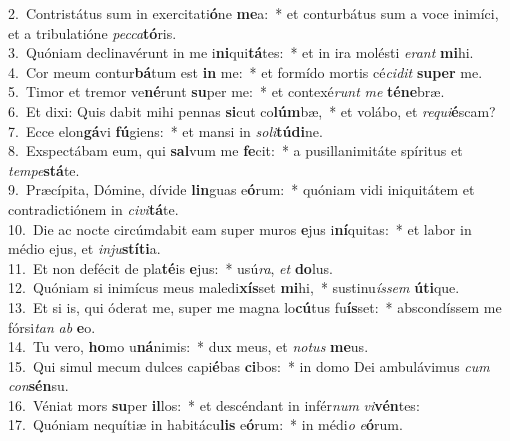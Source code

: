 {2.~}Contristátus sum in exercitati\textbf{ó}ne \textbf{me}a:~* et conturbátus sum a voce inimíci, et a tribulatióne \textit{pec}\textit{ca}\textbf{tó}ris.\\
{3.~}Quóniam declinavérunt in me i\textbf{ni}qui\textbf{tá}tes:~* et in ira molésti \textit{e}\textit{rant} \textbf{mi}hi.\\
{4.~}Cor meum contur\textbf{bá}tum est \textbf{in} me:~* et formído mortis cé\textit{ci}\textit{dit} \textbf{su}\textbf{per} me.\\
{5.~}Timor et tremor ve\textbf{né}runt \textbf{su}per me:~* et contexé\textit{runt} \textit{me} \textbf{té}\textbf{ne}bræ.\\
{6.~}Et dixi: Quis dabit mihi pennas \textbf{si}cut co\textbf{lúm}bæ,~* et volábo, et \textit{re}\textit{qui}\textbf{é}scam?\\
{7.~}Ecce elon\textbf{gá}vi \textbf{fú}giens:~* et mansi in \textit{so}\textit{li}\textbf{tú}\textbf{di}ne.\\
{8.~}Exspectábam eum, qui \textbf{sal}vum me \textbf{fe}cit:~* a pusillanimitáte spíritus et \textit{tem}\textit{pe}\textbf{stá}te.\\
{9.~}Præcípita, Dómine, dívide \textbf{lin}guas e\textbf{ó}rum:~* quóniam vidi iniquitátem et contradictiónem in \textit{ci}\textit{vi}\textbf{tá}te.\\
{10.~}Die ac nocte circúmdabit eam super muros \textbf{e}jus i\textbf{ní}quitas:~* et labor in médio ejus, et \textit{in}\textit{ju}\textbf{stí}\textbf{ti}a.\\
{11.~}Et non defécit de pla\textbf{té}is \textbf{e}jus:~* usú\textit{ra}, \textit{et} \textbf{do}lus.\\
{12.~}Quóniam si inimícus meus maledi\textbf{xís}set \textbf{mi}hi,~* sustinu\textit{ís}\textit{sem} \textbf{ú}\textbf{ti}que.\\
{13.~}Et si is, qui óderat me, super me magna lo\textbf{cú}tus fu\textbf{ís}set:~* abscondíssem me fórsi\textit{tan} \textit{ab} \textbf{e}o.\\
{14.~}Tu vero, \textbf{ho}mo u\textbf{ná}nimis:~* dux meus, et \textit{no}\textit{tus} \textbf{me}us.\\
{15.~}Qui simul mecum dulces capi\textbf{é}bas \textbf{ci}bos:~* in domo Dei ambulávimus \textit{cum} \textit{con}\textbf{sén}su.\\
{16.~}Véniat mors \textbf{su}per \textbf{il}los:~* et descéndant in infér\textit{num} \textit{vi}\textbf{vén}tes:\\
{17.~}Quóniam nequítiæ in habitácu\textbf{lis} e\textbf{ó}rum:~* in médi\textit{o} \textit{e}\textbf{ó}rum.\\
